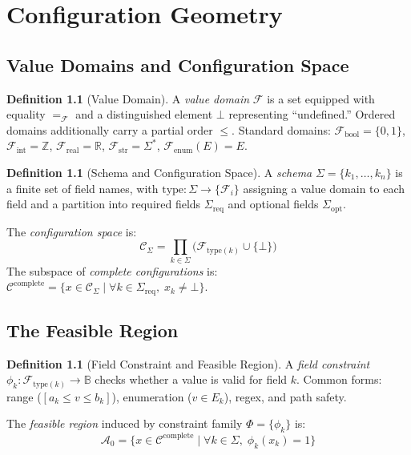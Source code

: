\documentclass[12pt, letterpaper]{report}
\theoremstyle{plain}
\theoremstyle{definition}
\newtheorem{definition}[theorem]{Definition}
\theoremstyle{remark}
\newcommand{\R}{\mathbb{R}}
\newcommand{\Z}{\mathbb{Z}}
\newcommand{\BB}{\mathbb{B}}
\newcommand{\CC}{\mathcal{C}}
\begin{document}
\chapter{Configuration Geometry}
\label{ch:geometry}

\section{Value Domains and Configuration Space}

\begin{definition}[Value Domain]
A \emph{value domain} $\mathcal{F}$ is a set equipped with equality $=_\mathcal{F}$
and a distinguished element $\bot$ representing ``undefined.''
Ordered domains additionally carry a partial order $\leq$.
Standard domains: $\mathcal{F}_{\mathrm{bool}} = \{0,1\}$,
$\mathcal{F}_{\mathrm{int}} = \Z$, $\mathcal{F}_{\mathrm{real}} = \R$,
$\mathcal{F}_{\mathrm{str}} = \Sigma^*$, $\mathcal{F}_{\mathrm{enum}}(E) = E$.
\end{definition}

\begin{definition}[Schema and Configuration Space]
\label{def:schema}
A \emph{schema} $\Sigma = \{k_1, \ldots, k_n\}$ is a finite set of field names,
with $\mathrm{type} : \Sigma \to \{\mathcal{F}_i\}$ assigning a value domain
to each field and a partition into required fields $\Sigma_{\mathrm{req}}$
and optional fields $\Sigma_{\mathrm{opt}}$.

The \emph{configuration space} is:
\[
  \CC_\Sigma = \prod_{k \in \Sigma} \bigl(\mathcal{F}_{\mathrm{type}(k)} \cup \{\bot\}\bigr)
\]
The subspace of \emph{complete configurations} is:
$\CC^{\mathrm{complete}} =
\{ x \in \CC_\Sigma \mid \forall k \in \Sigma_{\mathrm{req}},\; x_k \neq \bot \}$.
\end{definition}

\section{The Feasible Region}

\begin{definition}[Field Constraint and Feasible Region]
\label{def:feasible}
A \emph{field constraint} $\phi_k : \mathcal{F}_{\mathrm{type}(k)} \to \BB$
checks whether a value is valid for field $k$.
Common forms: range ($[a_k \leq v \leq b_k]$),
enumeration ($v \in E_k$), regex, and path safety.

The \emph{feasible region} induced by constraint family $\Phi = \{\phi_k\}$ is:
\[
  \mathcal{A}_0 = \bigl\{ x \in \CC^{\mathrm{complete}} \;\big|\;
  \forall k \in \Sigma,\; \phi_k(x_k) = 1 \bigr\}
\]
\end{definition}
\end{document}
